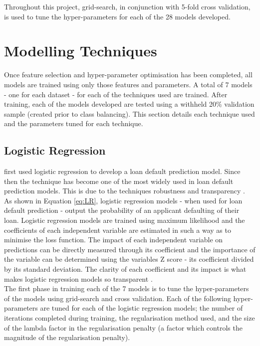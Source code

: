 Throughout this project, grid-search, in conjunction with 5-fold cross validation, is used to tune the hyper-parameters for each of the 28 models developed. 

\section{Modelling Techniques}

Once feature selection and hyper-parameter optimisation has been completed, all models are trained using only those features and parameters. A total of 7 models - one for each dataset - for each of the techniques used are trained. After training, each of the models developed are tested using a withheld 20\% validation sample (created prior to class balancing). This section details each technique used and the parameters tuned for each technique.  

\subsection{Logistic Regression}

\textcite{LogRegWiginton} first used logistic regression to develop a loan default prediction model. Since then the technique has become one of the most widely used in loan default prediction models. This is due to the techniques robustness and transparency \parencite{LogisticReg}. \\ 

As shown in Equation \ref{eq:LR}, logistic regression models - when used for loan default prediction - output the probability of an applicant defaulting of their loan. Logistic regression models are trained using maximum likelihood and the coefficients of each independent variable are estimated in such a way as to minimise the loss function. The impact of each independent variable on predictions can be directly measured through its coefficient and the importance of the variable can be determined using the variables Z score - its coefficient divided by its standard deviation.  The clarity of each coefficient and its impact is what makes logistic regression models so transparent \parencite{Hastie}. \\

The first phase in training each of the 7 models is to tune the hyper-parameters of the models using grid-search and cross validation. Each of the following hyper-parameters are tuned for each of the logistic regression models; the number of iterations completed during training, the regularisation method used, and the size of the lambda factor in the regularisation penalty (a factor which controls the magnitude of the regularisation penalty). \\

